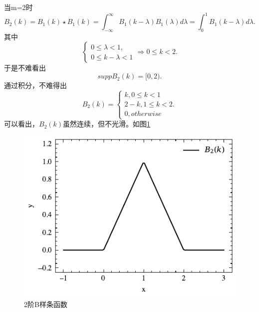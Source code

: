 当m=2时
\begin{equation*}
    B_{2}(k)=B_{1}(k)\star B_{1}(k)=\int_{-\infty}^{\infty}B_{1}(k-\lambda)B_{1}(\lambda)d\lambda=
\int_{0}^{1}B_{1}(k-\lambda)d\lambda .
\end{equation*}
其中
\begin{equation*}
    \left\{\begin{matrix} 
0 \le \lambda <1,\\
0\le k-\lambda <1
\end{matrix}\right. 
\Rightarrow 0\le k <2.
\end{equation*}
于是不难看出
\begin{equation}
    supp B_2(k)=[0,2).
\end{equation}
通过积分，不难得出
\begin{equation}
B_2(k)=
    \left\{\begin{matrix} 
k,0\le k<1\\
2-k,1\le k<2.\\
0,otherwise
\end{matrix}\right. 
\end{equation}
可以看出，$B_2(k)$虽然连续，但不光滑。如图\ref{B2}
\begin{figure}[htbp]
    \centering
    \includegraphics[width=0.76\linewidth]{figures/B-splin/B2.pdf}
    \caption{2阶B样条函数}
    \label{B2}
\end{figure}


